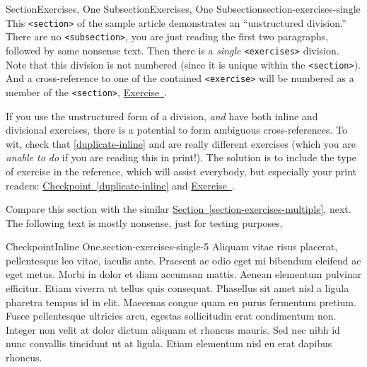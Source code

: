 \documentclass[twoside,10pt,]{article}
\newcommand{\xreffont}{\relax}
\newcommand{\mono}[1]{\texttt{#1}}
\numberwithin{equation}{section}
\begin{document}
%
%
\typeout{************************************************}
\typeout{************************************************}
%
\begin{sectionptx}{Section}{Exercises, One Subsection}{}{Exercises, One Subsection}{}{}{section-exercises-single}
This \mono{<section>} of the sample article demonstrates an ``unstructured division.''  There are no \mono{<subsection>}, you are just reading the first two paragraphs, followed by some nonsense text.  Then there is a \emph{single} \mono{<exercises>} division.  Note that this division is not numbered (since it is unique within the \mono{<section>}).  And a cross-reference to one of the contained \mono{<exercise>} will be numbered as a member of the \mono{<section>}, \hyperlink{exercise-challenging-one-unstructured}{Exercise~{\xreffont 36.4}}.%
\par
If you use the unstructured form of a division, \emph{and} have both inline and divisional exercises, there is a potential to form ambiguous cross-references.  To wit, check that \hyperref[duplicate-inline]{{\xreffont\ref{duplicate-inline}}} and \hyperlink{duplicate-divisional}{{\xreffont 36.2}} are really different exercises (which you are \emph{unable to do} if you are reading this in print!).  The solution is to include the type of exercise in the reference, which will assist everybody, but especially your print readers:  \hyperref[duplicate-inline]{Checkpoint~{\xreffont\ref{duplicate-inline}}} and \hyperlink{duplicate-divisional}{Exercise~{\xreffont 36.2}}.%
\par
Compare this section with the similar \hyperref[section-exercises-multiple]{Section~{\xreffont\ref{section-exercises-multiple}}}, next.  The following text is mostly nonsense, just for testing purposes.%
\begin{inlineexercise}{Checkpoint}{Inline One.}{section-exercises-single-5}%
Aliquam vitae risus placerat, pellentesque leo vitae, iaculis ante. Praesent ac odio eget mi bibendum eleifend ac eget metus. Morbi in dolor et diam accumsan mattis. Aenean elementum pulvinar efficitur. Etiam viverra ut tellus quis consequat. Phasellus sit amet nisl a ligula pharetra tempus id in elit. Maecenas congue quam eu purus fermentum pretium. Fusce pellentesque ultricies arcu, egestas sollicitudin erat condimentum non. Integer non velit at dolor dictum aliquam et rhoncus mauris. Sed nec nibh id nunc convallis tincidunt ut at ligula. Etiam elementum nisl eu erat dapibus rhoncus.%
\end{inlineexercise}%

\end{sectionptx}
\end{document}
